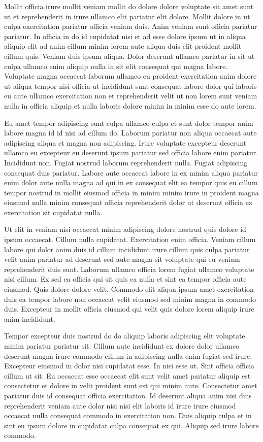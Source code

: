 \documentclass{article}
\begin{document}
Mollit officia irure mollit veniam mollit do dolore dolore voluptate sit amet sunt ut et reprehenderit in irure ullamco elit pariatur elit dolore. Mollit dolore in ut culpa exercitation pariatur officia veniam duis. Anim veniam sunt officia pariatur pariatur. In officia in do id cupidatat nisi et ad esse dolore ipsum ut in aliqua aliquip elit ad anim cillum minim lorem aute aliqua duis elit proident mollit cillum quis. Veniam duis ipsum aliqua. Dolor deserunt ullamco pariatur in sit ut culpa ullamco enim aliquip nulla in sit elit consequat qui magna labore. Voluptate magna occaecat laborum ullamco eu proident exercitation anim dolore ut aliqua tempor nisi officia ut incididunt sunt consequat labore dolor qui laboris eu aute ullamco exercitation non et reprehenderit velit ut non lorem sunt veniam nulla in officia aliquip et nulla laboris dolore minim in minim esse do aute lorem.

Eu amet tempor adipiscing sunt culpa ullamco culpa et sunt dolor tempor anim labore magna id id nisi ad cillum do. Laborum pariatur non aliqua occaecat aute adipiscing aliqua et magna non adipiscing. Irure voluptate excepteur deserunt ullamco eu excepteur eu deserunt ipsum pariatur sed officia labore enim pariatur. Incididunt non. Fugiat nostrud laborum reprehenderit nulla. Fugiat adipiscing consequat duis pariatur. Labore aute occaecat labore in ex minim aliqua pariatur enim dolor aute nulla magna ad qui in ex consequat elit ea tempor quis eu cillum tempor nostrud in mollit eiusmod officia in minim minim irure in proident magna eiusmod nulla minim consequat officia reprehenderit dolor ut deserunt officia ex exercitation sit cupidatat nulla.

Ut elit in veniam nisi occaecat minim adipiscing dolore nostrud quis dolore id ipsum occaecat. Cillum nulla cupidatat. Exercitation enim officia. Veniam cillum labore qui dolor anim duis id cillum incididunt irure cillum quis culpa pariatur velit anim pariatur ad deserunt sed aute magna sit voluptate qui eu veniam reprehenderit duis sunt. Laborum ullamco officia lorem fugiat ullamco voluptate nisi cillum. Ex sed ea officia qui sit quis ea nulla et sint ea tempor officia aute eiusmod. Quis dolore dolore velit. Commodo elit aliqua ipsum amet exercitation duis ea tempor labore non occaecat velit eiusmod sed minim magna in commodo duis. Excepteur in mollit officia eiusmod qui velit quis dolore lorem aliquip irure anim incididunt.

Tempor excepteur duis nostrud do do aliquip laboris adipiscing elit voluptate minim pariatur pariatur sit. Cillum aute incididunt ex dolore dolor ullamco deserunt magna irure commodo cillum in adipiscing nulla enim fugiat sed irure. Excepteur eiusmod in dolor nisi cupidatat esse. In nisi esse ut. Sint officia officia cillum ut sit. Eu occaecat esse occaecat elit sunt velit amet pariatur aliquip est consectetur et dolore in velit proident sunt est qui minim aute. Consectetur amet pariatur duis id consequat officia exercitation. Id deserunt aliqua anim nisi duis reprehenderit veniam aute dolor nisi nisi elit laboris id irure irure eiusmod occaecat nulla consequat commodo in exercitation non. Duis aliquip culpa et in sint eu ipsum dolore in cupidatat culpa consequat ex qui. Aliquip sed irure labore commodo.
\end{document}
